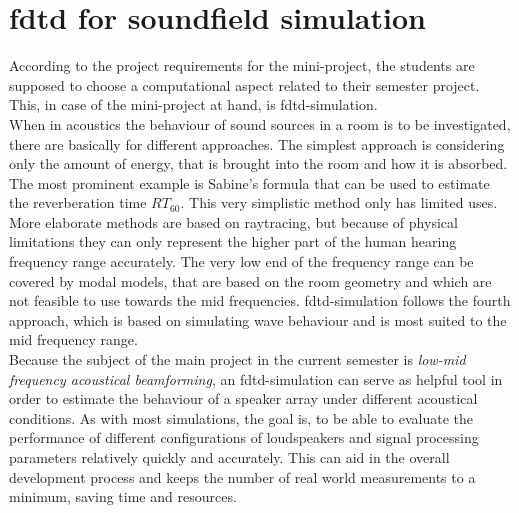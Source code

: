 \section{\gls{fdtd} for soundfield simulation}
According to the project requirements for the mini-project, the students are supposed to choose a computational aspect related to their semester project. This, in case of the mini-project at hand, is \gls{fdtd}-simulation.\\
When in acoustics the behaviour of sound sources in a room is to be investigated, there are basically for different approaches. The simplest approach is considering only the amount of energy, that is brought into the room and how it is absorbed. The most prominent example is Sabine's formula that can be used to estimate the reverberation time $RT_{60}$. This very simplistic method only has limited uses. More elaborate methods are based on raytracing, but because of physical limitations they can only represent the higher part of the human hearing frequency range accurately. The very low end of the frequency range can be covered by modal models, that are based on the room geometry and which are not feasible to use towards the mid frequencies. \gls{fdtd}-simulation follows the fourth approach, which is based on simulating wave behaviour and is most suited to the mid frequency range. \citep{finiteproblems}\\
Because the subject of the main project in the current semester is \textit{low-mid frequency acoustical beamforming}, an \gls{fdtd}-simulation can serve as helpful tool in order to estimate the behaviour of a speaker array under different acoustical conditions. As with most simulations, the goal is, to be able to evaluate the performance of different configurations of loudspeakers and signal processing parameters relatively quickly and accurately. This can aid in the overall development process and keeps the number of real world measurements to a minimum, saving time and resources.\\